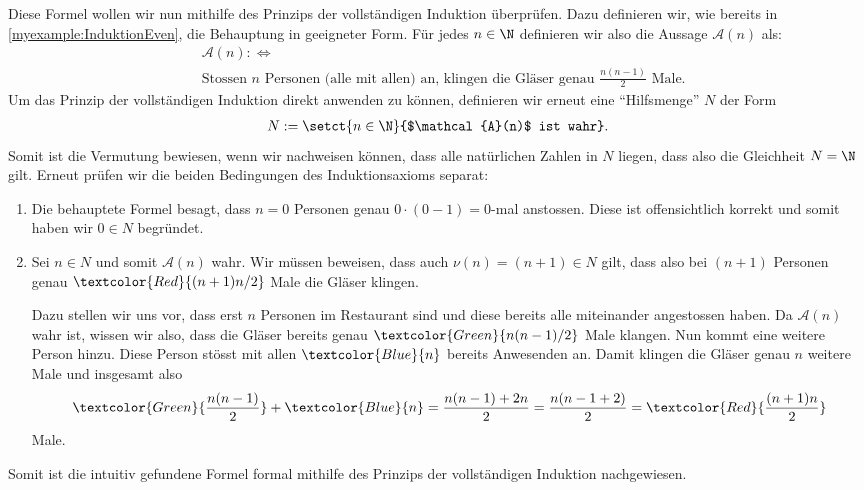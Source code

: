 \begin{myexample}\label{myexample:InduktionGlases}
Diese Formel wollen wir nun mithilfe des Prinzips der vollständigen Induktion überprüfen. Dazu definieren wir, wie bereits in \cref{myexample:InduktionEven}, die Behauptung in geeigneter Form. Für jedes $n\in\N$ definieren wir also die Aussage $\mathcal{A}(n)$ als:
\begin{align*}
	 & \mathcal{A}(n) :\iff                                                                                     \\
	 & \text{Stossen $n$ Personen (alle mit allen) an, klingen die Gläser genau } \frac{n(n-1)}{2}\text{ Male}.
\end{align*}
Um das Prinzip der vollständigen Induktion direkt anwenden zu können, definieren wir erneut eine \enquote{Hilfsmenge} $N$ der Form
\begin{align*}
	N := \setct{n\in\N}{$\mathcal{A}(n)$ ist wahr}.
\end{align*}
Somit ist die Vermutung bewiesen, wenn wir nachweisen können, dass alle natürlichen Zahlen in $N$ liegen, dass also die Gleichheit $N=\N$ gilt. Erneut prüfen wir die beiden Bedingungen des Induktionsaxioms separat:
\begin{enumerate}
	\item Die behauptete Formel besagt, dass $n = 0$ Personen genau $0\cdot (0-1) = 0$-mal anstossen. Diese ist offensichtlich korrekt und somit haben wir $0\in N$ begründet. \checkmark
	\item Sei $n\in N$ und somit $\mathcal{A}(n)$ wahr. Wir müssen beweisen, dass auch $\nu(n)=(n+1)\in N$ gilt, dass also bei $(n+1)$ Personen genau $\textcolor{Red}{(n+1)n/2}$ Male die Gläser klingen.

	      \noindent
	      Dazu stellen wir uns vor, dass erst $n$ Personen im Restaurant sind und diese bereits alle miteinander angestossen haben. Da $\mathcal{A}(n)$ wahr ist, wissen wir also, dass die Gläser bereits genau $\textcolor{Green}{n(n-1)/2}$ Male klangen. Nun kommt eine weitere Person hinzu. Diese Person stösst mit allen $\textcolor{Blue}{n}$ bereits Anwesenden an. Damit klingen die Gläser genau $n$ weitere Male und insgesamt also
	      \begin{align*}
		      \textcolor{Green}{\frac{n(n-1)}{2}} + \textcolor{Blue}{n} = \frac{n(n-1)+2n}{2} = \frac{n(n-1+2)}{2} = \textcolor{Red}{\frac{(n+1)n}{2}}
	      \end{align*}
	      Male. \checkmark
\end{enumerate}
Somit ist die intuitiv gefundene Formel formal mithilfe des Prinzips der vollständigen Induktion nachgewiesen.
\end{myexample}

